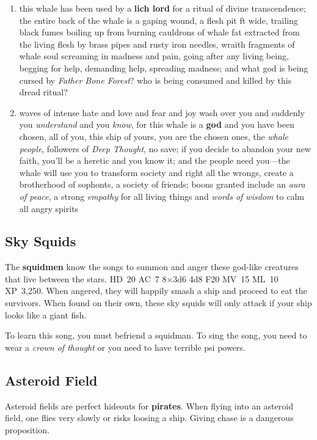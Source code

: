 \documentclass[a4paper,serif]{rpg-module}
\begin{document}
\begin{enumerate}
\item this whale has been used by a \textbf{lich lord} for a ritual of
  divine transcendence; the entire back of the whale is a gaping
  wound, a flesh pit \unit[500]{ft} wide, trailing black fumes boiling
  up from burning cauldrons of whale fat extracted from the living
  flesh by brass pipes and rusty iron needles, wraith fragments of
  whale soul screaming in madness and pain, going after any living
  being, begging for help, demanding help, spreading madness; and what
  god is being cursed by \textit{Father Bone Forest}? who is being
  consumed and killed by this dread ritual?

\item waves of intense hate and love and fear and joy wash over you
  and suddenly you \textit{understand} and you \textit{know}, for this
  whale is a \textbf{god} and you have been chosen, all of you, this
  ship of yours, you are the chosen ones, the \textit{whale people},
  followers of \textit{Deep Thought}, no save; if you decide to
  abandon your new faith, you'll be a heretic and you know it; and the
  people need you—the whale will use you to transform society and
  right all the wrongs, create a brotherhood of sophonts, a society of
  friends; boons granted include an \textit{aura of peace}, a strong
  \textit{empathy} for all living things and \textit{words of wisdom}
  to calm all angry spirits
\end{enumerate}

\subsection{Sky Squids}
\label{sec:sky-squids}

The \textbf{squidmen} know the songs to summon and anger these
god-like creatures that live between the stars. HD~20 AC~7 8×3d6 4d8
F20 MV~15 ML~10 XP~3,250. When angered, they will happily smash a ship
and proceed to eat the survivors. When found on their own, these sky
squids will only attack if your ship looks like a giant fish.

To learn this song, you must befriend a squidman. To sing the song,
you need to wear a \textit{crown of thought} or you need to have
terrible psi powers.

\subsection{Asteroid Field}
\label{sec:asteroid-field}

Asteroid fields are perfect hideouts for \textbf{pirates}. When flying
into an asteroid field, one flies very slowly or risks loosing a ship.
Giving chase is a dangerous proposition.
\end{document}
